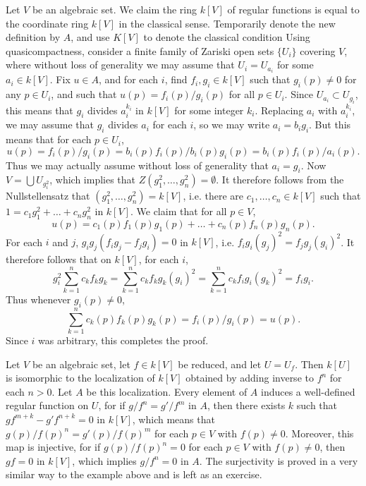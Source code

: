\begin{example}
    Let $V$ be an algebraic set. We claim the ring $k[V]$ of regular functions is equal to the coordinate ring $k[V]$ in the classical sense. Temporarily denote the new definition by $A$, and use $K[V]$ to denote the classical condition Using quasicompactness, consider a finite family of Zariski open sets $\{ U_i \}$ covering $V$, where without loss of generality we may assume that $U_i = U_{a_i}$ for some $a_i \in k[V]$. Fix $u \in A$, and for each $i$, find $f_i,g_i \in k[V]$ such that $g_i(p) \neq 0$ for any $p \in U_i$, and such that $u(p) = f_i(p)/g_i(p)$ for all $p \in U_i$. Since $U_{a_i} \subset U_{g_i}$, this means that $g_i$ divides $a_i^{k_i}$ in $k[V]$ for some integer $k_i$. Replacing $a_i$ with $a_i^{k_i}$, we may assume that $g_i$ divides $a_i$ for each $i$, so we may write $a_i = b_i g_i$. But this means that for each $p \in U_i$,
    \[ u(p) = f_i(p)/g_i(p) = b_i(p) f_i(p) / b_i(p) g_i(p) = b_i(p) f_i(p) / a_i(p). \]
    Thus we may actually assume without loss of generality that $a_i = g_i$. Now $V = \bigcup U_{g_i^2}$, which implies that $Z(g_1^2,\dots,g_n^2) = \emptyset$. It therefore follows from the Nullstellensatz that $(g_1^2,\dots,g_n^2) = k[V]$, i.e. there are $c_1,\dots,c_n \in k[V]$ such that $1 = c_1g_1^2 + \dots + c_ng_n^2$ in $k[V]$. We claim that for all $p \in V$,
    \[ u(p) = c_1(p) f_1(p) g_1(p) + \dots + c_n(p) f_n(p) g_n(p). \]
    For each $i$ and $j$, $g_ig_j(f_ig_j - f_jg_i) = 0$ in $k[V]$, i.e. $f_ig_i (g_j)^2 = f_jg_j (g_i)^2$. It therefore follows that on $k[V]$, for each $i$,
    \[ g_i^2 \sum_{k = 1}^n c_k f_k g_k = \sum_{k = 1}^n c_k f_k g_k (g_i)^2 = \sum_{k = 1}^n c_k f_i g_i (g_k)^2 = f_i g_i. \]
    Thus whenever $g_i(p) \neq 0$,
    \[ \sum_{k = 1}^n c_k(p) f_k(p) g_k(p) = f_i(p) / g_i(p) = u(p). \]
    Since $i$ was arbitrary, this completes the proof.
\end{example}

\begin{example}
    Let $V$ be an algebraic set, let $f \in k[V]$ be reduced, and let $U = U_f$. Then $k[U]$ is isomorphic to the localization of $k[V]$ obtained by adding inverse to $f^n$ for each $n > 0$. Let $A$ be this localization. Every element of $A$ induces a well-defined regular function on $U$, for if $g/f^n = g'/f^m$ in $A$, then there exists $k$ such that $gf^{m+k} - g'f^{n+k} = 0$ in $k[V]$, which means that $g(p)/f(p)^n = g'(p)/f(p)^m$ for each $p \in V$ with $f(p) \neq 0$. Moreover, this map is injective, for if $g(p)/f(p)^n = 0$ for each $p \in V$ with $f(p) \neq 0$, then $gf = 0$ in $k[V]$, which implies $g/f^n = 0$ in $A$. The surjectivity is proved in a very similar way to the example above and is left as an exercise.
\end{example}

